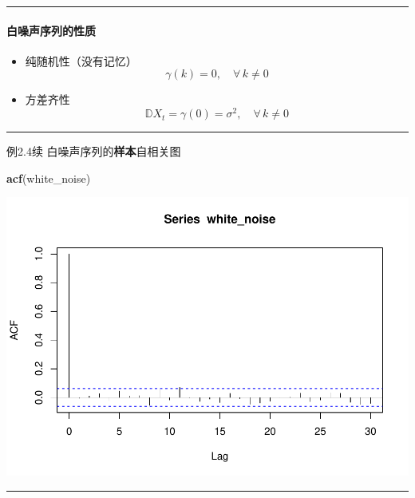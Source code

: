 \documentclass[]{article}
\newenvironment{Shaded}{\begin{snugshade}}{\end{snugshade}}
\newcommand{\KeywordTok}[1]{\textcolor[rgb]{0.13,0.29,0.53}{\textbf{#1}}}
\newcommand{\NormalTok}[1]{#1}
\providecommand{\tightlist}{%
  \setlength{\itemsep}{0pt}\setlength{\parskip}{0pt}}
\let\oldparagraph\paragraph
\renewcommand{\paragraph}[1]{\oldparagraph{#1}\mbox{}}
\begin{document}
\begin{center}\rule{0.5\linewidth}{\linethickness}\end{center}

\hypertarget{ux767dux566aux58f0ux5e8fux5217ux7684ux6027ux8d28}{%
\paragraph{白噪声序列的性质}\label{ux767dux566aux58f0ux5e8fux5217ux7684ux6027ux8d28}}

\begin{itemize}
\tightlist
\item
  纯随机性（没有记忆） \[
  \gamma(k) = 0,\quad\forall\,k\ne0
  \]
\item
  方差齐性 \[
  \mathbb{D}X_t = \gamma(0) = \sigma^2,\quad\forall\,k\ne0
  \]
\end{itemize}

\begin{center}\rule{0.5\linewidth}{\linethickness}\end{center}

例2.4续 白噪声序列的\textbf{样本}自相关图

\begin{Shaded}
\begin{Highlighting}[]
\KeywordTok{acf}\NormalTok{(white_noise)}
\end{Highlighting}
\end{Shaded}

\includegraphics{timeseries_files/figure-latex/unnamed-chunk-10-1.pdf}

\begin{center}\rule{0.5\linewidth}{\linethickness}\end{center}
\end{document}
